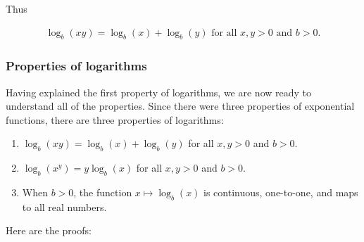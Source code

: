 Thus

\begin{align*}
    \log_b(xy) = \log_b(x) + \log_b(y) \text{ for all $x, y > 0$ and $b > 0$}.
\end{align*}


\subsubsection*{Properties of logarithms}

Having explained the first property of logarithms, we are now ready to understand all of the properties. Since there were three properties of exponential functions, there are three properties of logarithms:

\begin{enumerate}
    \item $\log_b(xy) = \log_b(x) + \log_b(y)$ for all $x, y > 0$ and $b > 0$.
    \item $\log_b(x^y) = y\log_b(x)$ for all $x, y > 0$ and $b > 0$.
    \item When $b > 0$, the function $x \mapsto \log_b(x)$ is continuous, one-to-one, and maps to all real numbers.
\end{enumerate}

Here are the proofs:

